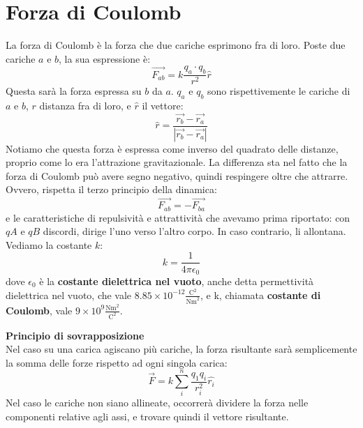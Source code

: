 \documentclass[a4paper,12pt]{article}
\begin{document}
\section{Forza di Coulomb}
La forza di Coulomb è la forza che due cariche esprimono fra di loro. Poste due cariche $a$ e $b$, 
la sua espressione è:
$$ \vec{F_{ab}} = k \frac{q_a\cdot q_b}{r^2}\hat{r}$$
Questa sarà la forza espressa su $b$ da $a$. $q_a$ e $q_b$ sono rispettivemente le cariche di $a$ e $b$, $r$ distanza
fra di loro, e $\hat{r}$ il vettore:
$$ \hat{r} = \frac{\vec{r_b} - \vec{r_a}}{|\vec{r_b} - \vec{r_a}|} $$
Notiamo che questa forza è espressa come inverso del quadrato delle distanze, proprio come lo era l'attrazione gravitazionale. La differenza
sta nel fatto che la forza di Coulomb può avere segno negativo, quindi respingere oltre che attrarre. Ovvero,
rispetta il terzo principio della dinamica:
$$ \vec{F_{ab}} = -\vec{F_{ba}} $$
e le caratteristiche di repulsività e attrattività che avevamo prima riportato: con $qA$ e $qB$ discordi, dirige 
l'uno verso l'altro corpo. In caso contrario, li allontana. Vediamo la costante $k$:
$$ k = \frac{1}{4\pi \epsilon_0} $$
dove $\epsilon_0$ è la \textbf{costante dielettrica nel vuoto}, anche detta permettività dielettrica nel vuoto, che
vale $8.85 \times 10^{-12} \frac{\mathrm{C}^2}{\mathrm{Nm}^2}$, e k, chiamata \textbf{costante di Coulomb}, vale
$ 9 \times 10^9 \frac{\mathrm{Nm}^2}{\mathrm{C}^2}$.
\par\smallskip
\textbf{Principio di sovrapposizione} \\
Nel caso su una carica agiscano più cariche, la forza risultante sarà semplicemente la somma delle forze rispetto ad ogni singola carica:
$$ \vec{F} = k \sum_i^n\frac{q_1 q_i}{r_i^2}\hat{r_i} $$
Nel caso le cariche non siano allineate, occorrerà dividere la forza nelle componenti relative agli assi, e trovare quindi il vettore risultante.
\end{document}
